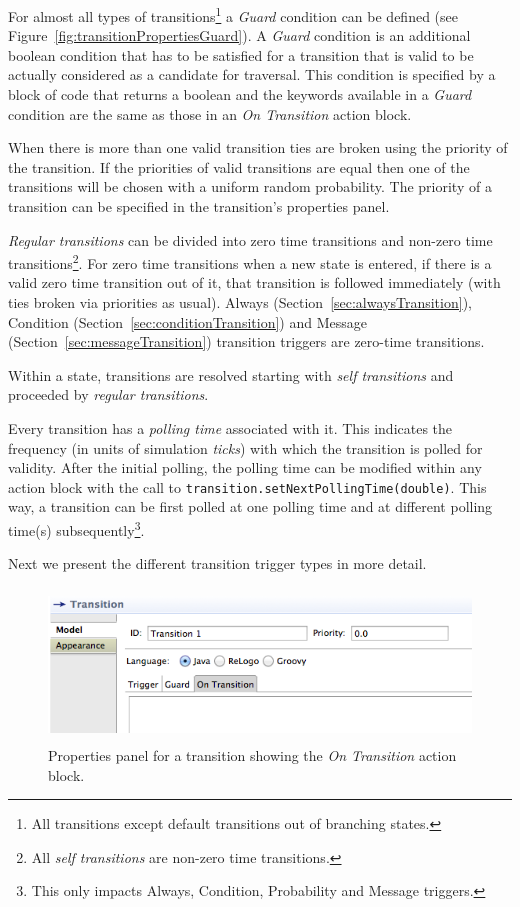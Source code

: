 \documentclass[11pt]{amsart}
\begin{document}
For almost all types of transitions\footnote{All transitions except default transitions out of branching states.} a \emph{Guard} condition can be defined (see Figure~\ref{fig:transitionPropertiesGuard}). A \emph{Guard} condition is an additional boolean condition that has to be satisfied for a transition that is valid to be actually considered as a candidate for traversal. This condition is specified by a block of code that returns a boolean and the keywords available in a \emph{Guard} condition are the same as those in an \emph{On Transition} action block.

When there is more than one valid transition ties are broken using the priority of the transition. If the priorities of valid transitions are equal then one of the transitions will be chosen with a uniform random probability. The priority of a transition can be specified in the transition's properties panel.

\emph{Regular transitions} can be divided into zero time transitions and non-zero time transitions\footnote{All \emph{self transitions} are non-zero time transitions.}. For zero time transitions when a new state is entered, if there is a valid zero time transition out of it, that transition is followed immediately (with ties broken via priorities as usual). Always (Section~\ref{sec:alwaysTransition}), Condition (Section~\ref{sec:conditionTransition}) and Message (Section~\ref{sec:messageTransition}) transition triggers are zero-time transitions.

Within a state, transitions are resolved starting with \emph{self transitions} and proceeded by \emph{regular transitions}.

Every transition has a \emph{polling time} associated with it. This indicates the frequency (in units of simulation \emph{ticks}) with which the transition is polled for validity. After the initial polling, the polling time can be modified within any action block with the call to \texttt{transition.setNextPollingTime(double)}. This way, a transition can be first polled at one polling time and at different polling time(s) subsequently\footnote{This only impacts Always, Condition, Probability and Message triggers.}.

Next we present the different transition trigger types in more detail.


\begin{figure}
\begin{center}
\vspace{.2in}
\centerline {
\includegraphics[height=1.6in]{StatechartsImages/TransitionPropertiesOnTransition.png}
}
\caption{Properties panel for a transition showing the \emph{On Transition} action block.}
\label{fig:transitionPropertiesOnTransition}
\end{center}
\end{figure}
\end{document}
